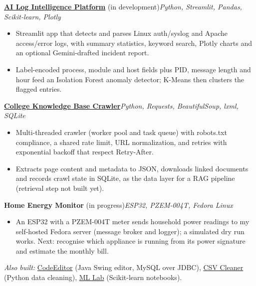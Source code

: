 \documentclass[11pt]{article}
\newcommand{\project}[4]{%
  \hspace*{6pt}\textbf{\href{#2}{#1}}#3\hfill\textit{#4}\par}
\newcommand{\projectnolink}[3]{%
  \hspace*{6pt}\textbf{#1}#2\hfill\textit{#3}\par}
\newenvironment{projectitems}
  {\begin{itemize}[topsep=1pt, itemsep=0.5pt]}
  {\end{itemize}\vspace{3pt}}
\begin{document}
\project{AI Log Intelligence Platform}{https://github.com/GurvirSinghH/AI-Log-Intelligence-Platform}%
  { (in development)}{Python, Streamlit, Pandas, Scikit-learn, Plotly}
\begin{projectitems}
  \item Streamlit app that detects and parses Linux auth/syslog and Apache access/error logs, with summary
        statistics, keyword search, Plotly charts and an optional Gemini-drafted incident report.
  \item Label-encoded process, module and host fields plus PID, message length and hour feed an
        Isolation Forest anomaly detector; K-Means then clusters the flagged entries.
\end{projectitems}

\project{College Knowledge Base Crawler}{https://github.com/GurvirSinghH/college-rag-assistant}%
  {}{Python, Requests, BeautifulSoup, lxml, SQLite}
\begin{projectitems}
  \item Multi-threaded crawler (worker pool and task queue) with robots.txt compliance, a shared rate
        limit, URL normalization, and retries with exponential backoff that respect Retry-After.
  \item Extracts page content and metadata to JSON, downloads linked documents and records crawl
        state in SQLite, as the data layer for a RAG pipeline (retrieval step not built yet).
\end{projectitems}

\projectnolink{Home Energy Monitor}{ (in progress)}{ESP32, PZEM-004T, Fedora Linux}
\begin{projectitems}
  \item An ESP32 with a PZEM-004T meter sends household power readings to my self-hosted Fedora server
        (message broker and logger); a simulated dry run works. Next: recognise which appliance is
        running from its power signature and estimate the monthly bill.
\end{projectitems}

\hspace*{6pt}\parbox{\dimexpr\linewidth-6pt}{%
  \textit{Also built:} \href{https://github.com/GurvirSinghH/CodeEditor}{CodeEditor} (Java Swing editor,
  MySQL over JDBC), \href{https://github.com/GurvirSinghH/csv-cleaner}{CSV Cleaner} (Python data cleaning),
  \href{https://github.com/GurvirSinghH/MLlab}{ML Lab} (Scikit-learn notebooks).}
\vspace{-2pt}
\end{document}

